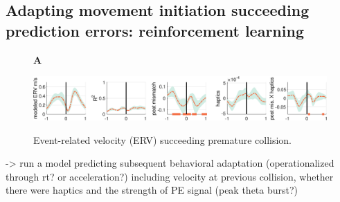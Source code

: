 \subsection{Adapting movement initiation succeeding prediction errors: reinforcement learning}

\begin{figure}[h]
  \begin{flushleft}\textbf{A}\end{flushleft}
  \includegraphics[width=\textwidth]{figures/vel_mocap_2.eps}
  \label{vel_erp_post_mismatch}
  \caption{Event-related velocity (ERV) succeeding premature collision.}
\end{figure}

-> run a model predicting subsequent behavioral adaptation (operationalized through rt? or acceleration?) including velocity at previous collision, whether there were haptics and the strength of PE signal (peak theta burst?)

